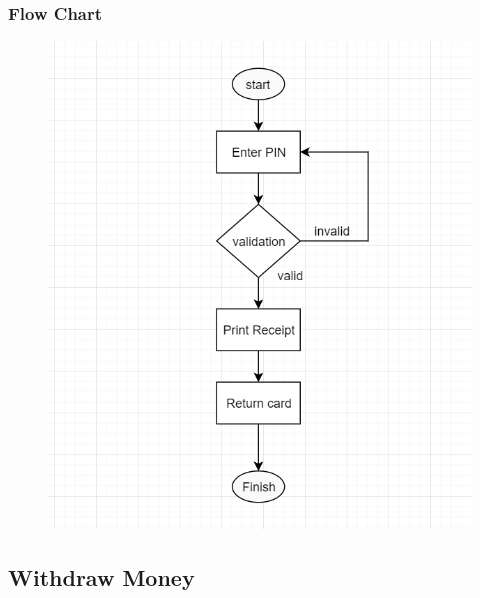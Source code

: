 \documentclass{article}
\begin{document}
		\newpage\subsubsection{Flow Chart}
		\begin{figure}[h!]
			\begin{center}
				\includegraphics[height=\linewidth]{img/inquiry_flowchart.png}
			\end{center}
		\end{figure}
	
	\newpage\subsection{Withdraw Money}
\end{document}
